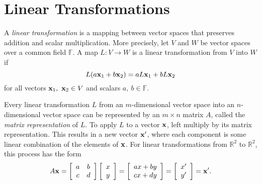 
\section*{Linear Transformations} %

A \emph{linear transformation} is a mapping between vector spaces that preserves addition and scalar multiplication.
More precisely, let $V$ and $W$ be vector spaces over a common field $\mathbb{F}$.
A map $L:V\rightarrow W$ is a linear transformation from $V$ into $W$ if
\[L(a\mathbf{x}_1 + b\mathbf{x}_2) = aL\mathbf{x}_1 + bL\mathbf{x}_2\] for all vectors $\mathbf{x}_1,\ \mathbf{x}_2 \in V$ and scalars $a,\ b \in \mathbb{F}$.

Every linear transformation $L$ from an $m$-dimensional vector space into an $n$-dimensional vector space can be represented by an $m\times n$ matrix $A$, called the \emph{matrix representation} of $L$.
To apply $L$ to a vector $\mathbf{x}$, left multiply by its matrix representation.
This results in a new vector $\mathbf{x}^\prime$, where each component is some linear combination of the elements of $\mathbf{x}$.
For linear transformations from $\mathbb{R}^2$ to $\mathbb{R}^2$, this process has the form
\begin{align*}
A\mathbf{x} =
\left[\begin{array}{cc}
a & b \\
c & d \\
\end{array}\right]
\left[\begin{array}{c}
x\\y
\end{array}\right]
=
\left[\begin{array}{cc}
ax + by \\cx + dy
\end{array}\right]
=
\left[\begin{array}{cc}
x^\prime \\y^\prime
\end{array}\right]
= \mathbf{x}^\prime.
\end{align*}

